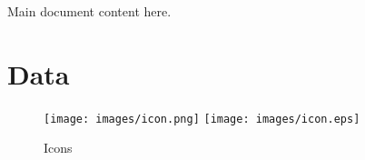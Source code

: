 \documentclass{article}
\begin{document}

Main document content here.


\section{Data}

\begin{figure}
    \texttt{[image: images/icon.png]} %
    \texttt{[image: images/icon.eps]} %
    \caption{Icons}
\end{figure}

\printbibliography
\end{document}
